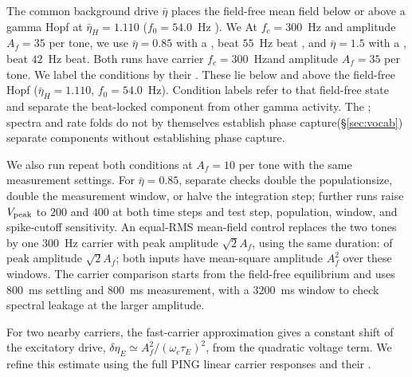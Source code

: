 \documentclass[11pt,a4paper]{article}
\providecommand{\DIFaddtex}[1]{{\protect\color{blue} \sf #1}} %
\providecommand{\DIFdeltex}[1]{{\protect\color{red} \scriptsize #1}} %
\providecommand{\DIFaddbegin}{} %
\providecommand{\DIFaddend}{} %
\providecommand{\DIFdelbegin}{} %
\providecommand{\DIFdelend}{} %
\providecommand{\DIFadd}[1]{\texorpdfstring{\DIFaddtex{#1}}{#1}} %
\providecommand{\DIFdel}[1]{\texorpdfstring{\DIFdeltex{#1}}{}} %
\begin{document}
\DIFdelbegin \DIFdel{The common background drive $\bar\eta$ places the field-free mean field below or
above a gamma Hopf at $\bar\eta_H=1.110$ ($f_0=54.0$~Hz ). We }\DIFdelend \DIFaddbegin \DIFadd{At $f_c=300$~Hz and amplitude $A_f=35$ per tone, we }\DIFaddend use
$\bar\eta=0.85$\DIFdelbegin \DIFdel{with a }\DIFdelend \DIFaddbegin \DIFadd{, beat }\DIFaddend $55$~Hz\DIFdelbegin \DIFdel{beat }\DIFdelend \DIFaddbegin \DIFadd{, }\DIFaddend and $\bar\eta=1.5$\DIFdelbegin \DIFdel{with a }\DIFdelend \DIFaddbegin \DIFadd{, beat }\DIFaddend $42$~Hz\DIFdelbegin \DIFdel{beat.
Both runs have carrier $f_c=300$~Hzand amplitude $A_f=35$ per tone. We label the conditions by their }\DIFdelend \DIFaddbegin \DIFadd{.
These lie below and above the }\DIFaddend field-free \DIFaddbegin \DIFadd{Hopf
($\bar\eta_H=1.110$, $f_0=54.0$~Hz). Condition labels refer to that
field-free }\DIFaddend state\DIFdelbegin \DIFdel{and separate the beat-locked
component from other gamma activity. The }\DIFdelend \DIFaddbegin \DIFadd{; }\DIFaddend spectra and rate folds \DIFdelbegin \DIFdel{do not by themselves
establish phase capture(\S\ref{sec:vocab})}\DIFdelend \DIFaddbegin \DIFadd{separate components without
establishing phase capture}\DIFaddend .

We \DIFdelbegin \DIFdel{also run }\DIFdelend \DIFaddbegin \DIFadd{repeat }\DIFaddend both conditions at $A_f=10$ \DIFdelbegin \DIFdel{per tone with the same measurement
settings. For $\bar\eta=0.85$, separate checks double the populationsize, double the measurement window,
or halve the integration step; further runs raise
$V_{\rm peak}$ to $200$ and $400$ at both time steps}\DIFdelend \DIFaddbegin \DIFadd{and test step, population, window,
and spike-cutoff sensitivity}\DIFaddend . An equal-RMS mean-field control replaces the
two tones by one $300$~Hz carrier \DIFdelbegin \DIFdel{with peak amplitude $\sqrt{2}A_f$, using the same duration: }\DIFdelend \DIFaddbegin \DIFadd{of peak amplitude $\sqrt2 A_f$;
}\DIFaddend both inputs have mean-square amplitude $A_f^2$\DIFdelbegin \DIFdel{over these windows.
The carrier comparison starts from the field-free equilibrium and uses $800$~ms settling and $800$~ms measurement,
with a $3200$~ms window to check spectral leakage at the larger amplitude.
}%

\DIFdel{For two nearby carriers, the fast-carrier approximation gives a constant shift
of the excitatory drive, $\delta\eta_E\simeq A_f^2/(\omega_c\tau_E)^2$, from the
quadratic voltage term. We refine this estimate using the full PING linear carrier
responses and their }\DIFdelend \DIFaddbegin \DIFadd{.
}
\end{document}
